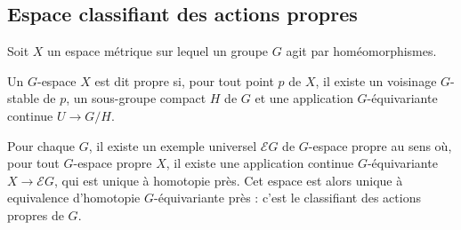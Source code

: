 \subsection{Espace classifiant des actions propres}

Soit $X$ un espace métrique sur lequel un groupe $G$  agit par homéomorphismes. %
\begin{definition}
Un $G$-espace $X$ est dit propre si, pour tout point $p$ de $X$, il existe un voisinage $G$-stable de $p$, un sous-groupe compact $H$ de $G$ et une application $G$-équivariante continue $U\rightarrow G/H$.
\end{definition}

Pour chaque $G$, il existe un exemple universel $\mathcal E G$ de $G$-espace propre au sens où, pour tout $G$-espace propre $X$, il existe une application continue $G$-équivariante $X\rightarrow \mathcal E G$, qui est unique à homotopie près. Cet espace est alors unique à equivalence d'homotopie $G$-équivariante près : c'est le classifiant des actions propres de $G$.\\

